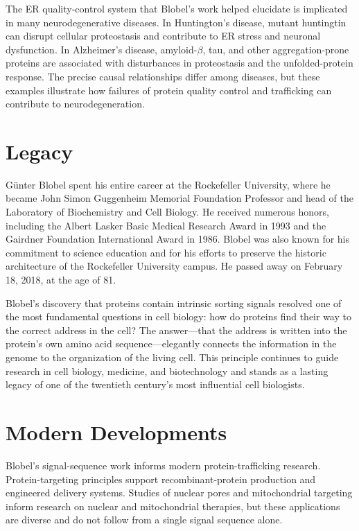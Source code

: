 The ER quality-control system that Blobel's work helped elucidate is implicated in many neurodegenerative diseases. In Huntington's disease, mutant huntingtin can disrupt cellular proteostasis and contribute to ER stress and neuronal dysfunction. In Alzheimer's disease, amyloid-$\beta$, tau, and other aggregation-prone proteins are associated with disturbances in proteostasis and the unfolded-protein response. The precise causal relationships differ among diseases, but these examples illustrate how failures of protein quality control and trafficking can contribute to neurodegeneration.

\section{Legacy}

G\"unter Blobel spent his entire career at the Rockefeller University, where he became John Simon Guggenheim Memorial Foundation Professor and head of the Laboratory of Biochemistry and Cell Biology. He received numerous honors, including the Albert Lasker Basic Medical Research Award in 1993 and the Gairdner Foundation International Award in 1986. Blobel was also known for his commitment to science education and for his efforts to preserve the historic architecture of the Rockefeller University campus. He passed away on February 18, 2018, at the age of 81.

Blobel's discovery that proteins contain intrinsic sorting signals resolved one of the most fundamental questions in cell biology: how do proteins find their way to the correct address in the cell? The answer---that the address is written into the protein's own amino acid sequence---elegantly connects the information in the genome to the organization of the living cell. This principle continues to guide research in cell biology, medicine, and biotechnology and stands as a lasting legacy of one of the twentieth century's most influential cell biologists.


\section{Modern Developments}

Blobel's signal-sequence work informs modern protein-trafficking research. Protein-targeting principles support recombinant-protein production and engineered delivery systems. Studies of nuclear pores and mitochondrial targeting inform research on nuclear and mitochondrial therapies, but these applications are diverse and do not follow from a single signal sequence alone.


